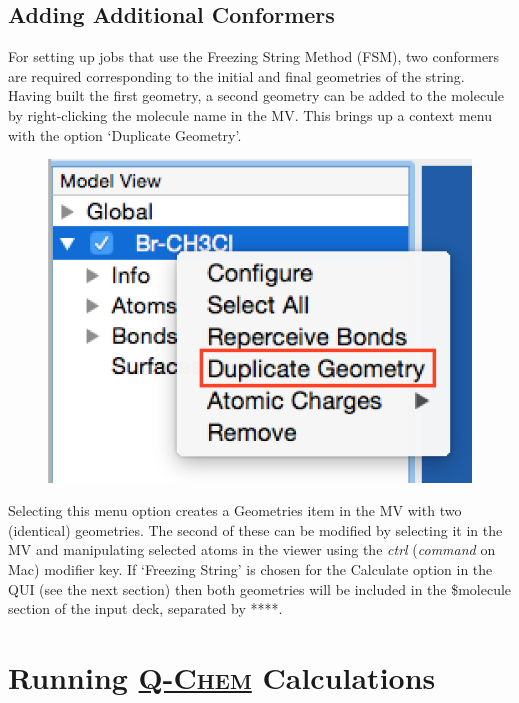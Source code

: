 \documentclass[a4paper,12pt]{article}
\newcommand{\qchem}{\href{http://q-chem.com}{{\scshape Q-Chem}}}
\begin{document}
\subsection{Adding Additional Conformers}

For setting up jobs that use the Freezing String Method (FSM), two conformers
are required corresponding to the initial and final geometries of the string.
Having built the first geometry, a second geometry can be added to the molecule
by right-clicking the molecule name in the MV.  This brings up a context menu
with the option `Duplicate Geometry'.  
\begin{figure}[h]
\begin{center}
\includegraphics[scale=0.4]{figures/MoleculeContext.png}
\end{center}
\end{figure}
Selecting this menu option creates a Geometries item in the MV with two
(identical) geometries.  The second of these can be modified by selecting it in
the MV and manipulating selected atoms in the viewer using the \emph{ctrl}
(\emph{command} on Mac) modifier key.  If `Freezing String' is chosen for the Calculate
option in the QUI (see the next section) then both geometries will be included
in the \$molecule section of the input deck, separated by ****.





\newpage
\section{Running \qchem{} Calculations}
\end{document}
